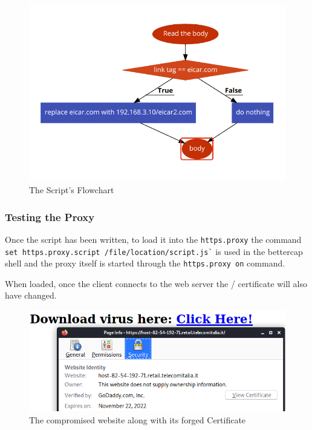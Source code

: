 \begin{figure}[h!]
 \centering
 \includegraphics[width=13cm]{img/script_flowchart.png}
 \caption{The Script's Flowchart}
 \label{fig: flowchart}
\end{figure}

\newpage

\subsubsection{Testing the Proxy}

Once the script has been written, to load it into the \verb|https.proxy| the command \verb|set https.proxy.script /file/location/script.js`| is used in the bettercap shell and the proxy itself is started through the \verb|https.proxy on| command.

When loaded, once the client connects to the web server the / certificate will also have changed.

\begin{figure}[h!]
 \centering
 \includegraphics[width=13cm]{img/spoofed_certificate.png}
 \caption{The compromised website along with its forged Certificate}
 \label{fig: spoofed-certificate}
\end{figure}

